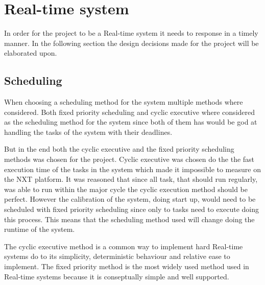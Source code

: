 \section{Real-time system}\label{Design:RTS} 
In order for the project to be a Real-time system it needs to response in a timely manner. 
In the following section the design decisions made for the project will be elaborated upon. 


\subsection{Scheduling}\label{Design:Scheduling}
When choosing a scheduling method for the system multiple  methods where considered. 
Both fixed priority scheduling and cyclic executive where considered as the scheduling method for the system since both of them has would be god at handling the tasks of the system with their deadlines.

But in the end both the cyclic executive and the fixed priority scheduling methods was chosen for the project. 
Cyclic executive was chosen do the the fast execution time of the tasks in the system which made it impossible to measure on the NXT platform. 
It was reasoned that since all task, that should run regularly, was able to run within the major cycle the cyclic execution method should be perfect. 
However the calibration of the system, doing start up, would need to be scheduled with fixed priority scheduling since only to tasks need to execute doing this process. 
This means that the scheduling method used will change doing the runtime of the system. 

The cyclic executive method is a common way to implement hard Real-time systems do to its simplicity, deterministic behaviour and relative ease to implement\cite{CyclicExecutionKimLarsen}.
The fixed priority method is the most widely used method used in Real-time systems because it is conseptually simple and well supported\cite{TaskBasedSchedulingKimLarsen}.